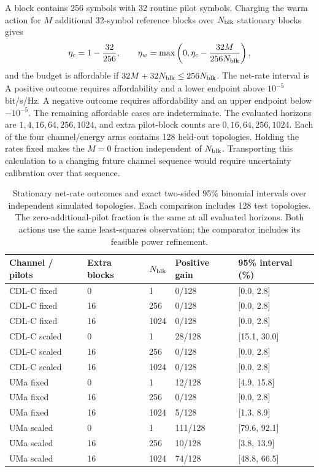 \documentclass[10pt,letterpaper]{article}
\begin{document}
A block contains 256 symbols with 32 routine pilot symbols. Charging the warm action for \(M\) additional 32-symbol reference blocks over \(N_{\rm blk}\) stationary blocks gives
\begin{equation}
\eta_c=1-\frac{32}{256},\qquad
\eta_w=\max\left(0,\eta_c-\frac{32M}{256N_{\rm blk}}\right),
\end{equation}
and the budget is affordable if \(32M+32N_{\rm blk}\leq256N_{\rm blk}\). The net-rate interval is
\begin{equation}
[\eta_w l_w-\eta_c u_c,\ \eta_w u_w-\eta_c l_c].
\end{equation}
A positive outcome requires affordability and a lower endpoint above \(10^{-5}\) bit/s/Hz. A negative outcome requires affordability and an upper endpoint below \(-10^{-5}\). The remaining affordable cases are indeterminate. The evaluated horizons are \(1,4,16,64,256,1024\), and extra pilot-block counts are \(0,16,64,256,1024\). Each of the four channel/energy arms contains 128 held-out topologies. Holding the rates fixed makes the \(M=0\) fraction independent of \(N_{\rm blk}\). Transporting this calculation to a changing future channel sequence would require uncertainty calibration over that sequence.

\begin{table}[htbp]\centering\small
\setlength{\tabcolsep}{4pt}
\caption{Stationary net-rate outcomes and exact two-sided 95\% binomial intervals over independent simulated topologies. Each comparison includes 128 test topologies. The zero-additional-pilot fraction is the same at all evaluated horizons. Both actions use the same least-squares observation; the comparator includes its feasible power refinement.}\label{supp:table7}
\begin{tabular}{lllll}\toprule
Channel / pilots & Extra blocks & $N_{\rm blk}$ & Positive gain & 95\% interval (\%)\\
\midrule
CDL-C fixed & 0 & 1 & 0/128 & [0.0, 2.8]\\
CDL-C fixed & 16 & 256 & 0/128 & [0.0, 2.8]\\
CDL-C fixed & 16 & 1024 & 0/128 & [0.0, 2.8]\\
CDL-C scaled & 0 & 1 & 28/128 & [15.1, 30.0]\\
CDL-C scaled & 16 & 256 & 0/128 & [0.0, 2.8]\\
CDL-C scaled & 16 & 1024 & 0/128 & [0.0, 2.8]\\
UMa fixed & 0 & 1 & 12/128 & [4.9, 15.8]\\
UMa fixed & 16 & 256 & 0/128 & [0.0, 2.8]\\
UMa fixed & 16 & 1024 & 5/128 & [1.3, 8.9]\\
UMa scaled & 0 & 1 & 111/128 & [79.6, 92.1]\\
UMa scaled & 16 & 256 & 10/128 & [3.8, 13.9]\\
UMa scaled & 16 & 1024 & 74/128 & [48.8, 66.5]\\
\bottomrule\end{tabular}
\end{table}
\end{document}

